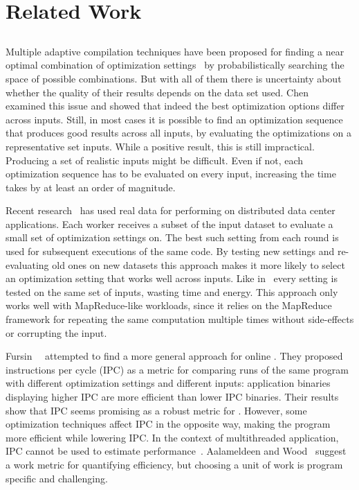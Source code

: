\section{Related Work}\label{sec:relatedwork}

\subsection{{\IterComp}}
Multiple adaptive compilation techniques have been proposed for finding a near optimal combination of optimization
settings~\cite{agakov06,hoste08,kulkarni04,stephenson03} by probabilistically searching the space of possible combinations. But with
all of them there is uncertainty about whether the quality of their results depends on the data set used. Chen~\etal~\cite{chen10,chen12a}
examined this issue and showed that indeed the best optimization options differ across inputs. Still, in most cases it is possible to find
an optimization sequence that produces good results across all inputs, by evaluating the optimizations on a representative set inputs.
While a positive result, this is still impractical. Producing a set of realistic inputs might be difficult. Even if not, each
optimization sequence has to be evaluated on every input, increasing the time \itercomp takes by at least an order of
magnitude.

Recent research~\cite{chen12b,fang15} has used real data for performing {\itercomp} on distributed data center applications. Each
worker receives a subset of the input dataset to evaluate a small set of optimization settings on. The best such setting from each round
is used for subsequent executions of the same code. By testing new settings and re-evaluating old ones on new datasets this approach makes
it more likely to select an optimization setting that works well across inputs. Like in~\cite{chen10} every setting is tested on the same
set of inputs, wasting time and energy. This approach only works well with MapReduce-like workloads, since it relies on the MapReduce
framework for repeating the same computation multiple times without side-effects or corrupting the input.

Fursin~\etal~\cite{fursin07} attempted to find a more general approach for online \itercomp. They proposed instructions per cycle (IPC) as
a metric for comparing runs of the same program with different optimization settings and different inputs: application binaries displaying
higher IPC are more efficient than lower IPC binaries. Their results show that IPC seems promising as a robust metric for {\itercomp}.
However, some optimization techniques affect IPC in the opposite way, making the program more efficient while lowering IPC. In the context
of multithreaded application, IPC cannot be used to estimate performance~\cite{alameldeen06,eyerman08}. Aalameldeen and
Wood~\cite{alameldeen06} suggest a work metric for quantifying efficiency, but choosing a unit of work is program specific and challenging.

